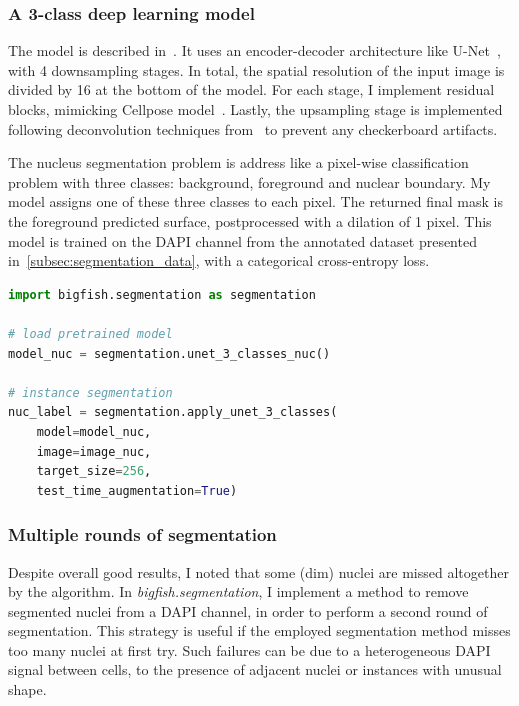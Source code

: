 \subsubsection{A 3-class deep learning model}

The model is described in~\cite{Imbert_fq_2022}.
It uses an encoder-decoder architecture like U-Net~\cite{Ronneberger_unet}, with 4 downsampling stages.
In total, the spatial resolution of the input image is divided by 16 at the bottom of the model.
For each stage, I implement residual blocks, mimicking Cellpose model~\cite{stringer_cellpose_2021}.
Lastly, the upsampling stage is implemented following deconvolution techniques from~\cite{odena2016deconvolution} to prevent any checkerboard artifacts.

The nucleus segmentation problem is address like a pixel-wise classification problem with three classes: background, foreground and nuclear boundary.
My model assigns one of these three classes to each pixel.
The returned final mask is the foreground predicted surface, postprocessed with a dilation of 1 pixel.
This model is trained on the DAPI channel from the annotated dataset presented in~\ref{subsec:segmentation_data}, with a categorical cross-entropy loss.\\

\begin{minipage}{0.9\textwidth}
\begin{lstlisting}[language=Python]
import bigfish.segmentation as segmentation

# load pretrained model
model_nuc = segmentation.unet_3_classes_nuc()

# instance segmentation
nuc_label = segmentation.apply_unet_3_classes(
    model=model_nuc,
	image=image_nuc,
	target_size=256,
	test_time_augmentation=True)
\end{lstlisting}
\end{minipage}

\subsubsection{Multiple rounds of segmentation}

Despite overall good results, I noted that some (dim) nuclei are missed altogether by the algorithm.
In \emph{bigfish.segmentation}, I implement a method to remove segmented nuclei from a DAPI channel, in order to perform a second round of segmentation.
This strategy is useful if the employed segmentation method misses too many nuclei at first try.
Such failures can be due to a heterogeneous DAPI signal between cells, to the presence of adjacent nuclei or instances with unusual shape.

